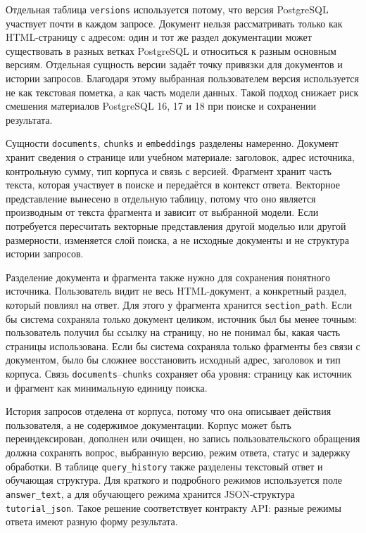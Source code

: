 Отдельная таблица \texttt{versions} используется потому, что версия PostgreSQL участвует почти в каждом запросе. Документ нельзя рассматривать только как HTML-страницу с адресом: один и тот же раздел документации может существовать в разных ветках PostgreSQL и относиться к разным основным версиям. Отдельная сущность версии задаёт точку привязки для документов и истории запросов. Благодаря этому выбранная пользователем версия используется не как текстовая пометка, а как часть модели данных. Такой подход снижает риск смешения материалов PostgreSQL 16, 17 и 18 при поиске и сохранении результата.

Сущности \texttt{documents}, \texttt{chunks} и \texttt{embeddings} разделены намеренно. Документ хранит сведения о странице или учебном материале: заголовок, адрес источника, контрольную сумму, тип корпуса и связь с версией. Фрагмент хранит часть текста, которая участвует в поиске и передаётся в контекст ответа. Векторное представление вынесено в отдельную таблицу, потому что оно является производным от текста фрагмента и зависит от выбранной модели. Если потребуется пересчитать векторные представления другой моделью или другой размерности, изменяется слой поиска, а не исходные документы и не структура истории запросов.

Разделение документа и фрагмента также нужно для сохранения понятного источника. Пользователь видит не весь HTML-документ, а конкретный раздел, который повлиял на ответ. Для этого у фрагмента хранится \texttt{section\_path}. Если бы система сохраняла только документ целиком, источник был бы менее точным: пользователь получил бы ссылку на страницу, но не понимал бы, какая часть страницы использована. Если бы система сохраняла только фрагменты без связи с документом, было бы сложнее восстановить исходный адрес, заголовок и тип корпуса. Связь \texttt{documents}--\texttt{chunks} сохраняет оба уровня: страницу как источник и фрагмент как минимальную единицу поиска.

История запросов отделена от корпуса, потому что она описывает действия пользователя, а не содержимое документации. Корпус может быть переиндексирован, дополнен или очищен, но запись пользовательского обращения должна сохранять вопрос, выбранную версию, режим ответа, статус и задержку обработки. В таблице \texttt{query\_history} также разделены текстовый ответ и обучающая структура. Для краткого и подробного режимов используется поле \texttt{answer\_text}, а для обучающего режима хранится JSON-структура \texttt{tutorial\_json}. Такое решение соответствует контракту API: разные режимы ответа имеют разную форму результата.

